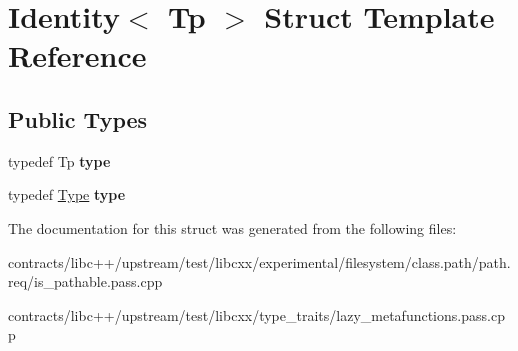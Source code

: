 \hypertarget{struct_identity}{}\section{Identity$<$ Tp $>$ Struct Template Reference}
\label{struct_identity}
\subsection*{Public Types}
\begin{DoxyCompactItemize}
\item 
\mbox{\label{struct_identity_a3a9b345b9fa54e2373004dfb79abf1e0}} 
typedef Tp {\bfseries type}
\item 
\mbox{\label{struct_identity_abdbd2199ae68b111128f0e734ffb89a3}} 
typedef \mbox{\hyperlink{struct_type}{Type}} {\bfseries type}
\end{DoxyCompactItemize}


The documentation for this struct was generated from the following files\+:\begin{DoxyCompactItemize}
\item 
contracts/libc++/upstream/test/libcxx/experimental/filesystem/class.\+path/path.\+req/is\+\_\+pathable.\+pass.\+cpp\item 
contracts/libc++/upstream/test/libcxx/type\+\_\+traits/lazy\+\_\+metafunctions.\+pass.\+cpp\end{DoxyCompactItemize}
